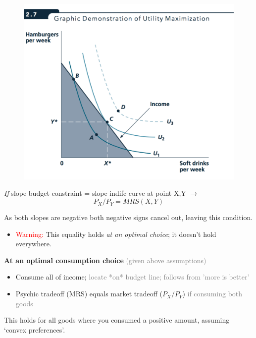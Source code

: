\documentclass[table]{beamer}
\providecommand{\tightlist}{%
  \setlength{\itemsep}{0pt}\setlength{\parskip}{0pt}}
\begin{document}
\begin{frame}

\begin{figure}

{\centering \includegraphics[width=0.5\linewidth]{picsfigs/utilmax} 

}

\end{figure}

\bigskip

\emph{If} slope budget constraint = slope indifc curve at point X,Y
\(\rightarrow\) \[P_X/P_Y = MRS(X,Y)\]

As both slopes are negative both negative signs cancel out, leaving this
condition.

\begin{itemize}[<+->]
\tightlist
\item
  \textcolor{red}{Warning:} This equality holds \emph{at an optimal
  choice}; it doesn't hold everywhere.
\end{itemize}

\end{frame}

\begin{frame}

\textbf{At an optimal consumption choice}
\textcolor{gray}{(given above assumptions)}

\begin{itemize}
\tightlist
\item
  Consume all of income;
  \textcolor{gray}{locate *on* budget line; follows from 'more is better'}
\end{itemize}

\begin{itemize}[<+->]
\tightlist
\item
  Psychic tradeoff (MRS) equals market tradeoff (\(P_X/P_Y\))
  \textcolor{gray}{if consuming both goods}
\end{itemize}

This holds for all goods where you consumed a positive amount, assuming
`convex preferences'.

\end{frame}
\end{document}
